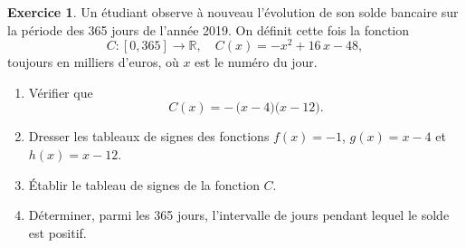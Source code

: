 \documentclass{article}
\theoremstyle{definition}
\newtheorem{exercice}{Exercice}
\begin{document}
% 

\begin{exercice}
  Un étudiant observe à nouveau l'évolution de son solde bancaire sur la période des 365 jours de l'année 2019.
  On définit cette fois la fonction
  \[
    C : [0, 365] \to \mathbb{R}, \quad C(x) = -x^2 + 16\,x - 48,
  \]
  toujours en milliers d'euros, où \(x\) est le numéro du jour.

  \begin{enumerate}
    \item Vérifier que
      \[
        C(x) = -\,\bigl(x - 4\bigr)\bigl(x - 12\bigr).
      \]
    \item Dresser les tableaux de signes des fonctions $f(x) = -1$, $g(x) = x - 4$ et $h(x) = x - 12$.
    \item Établir le tableau de signes de la fonction \(C\).
    \item Déterminer, parmi les 365 jours, l'intervalle de jours pendant lequel le solde est positif.
  \end{enumerate}
  \begin{center}
  \end{center}
\end{exercice}
\end{document}
